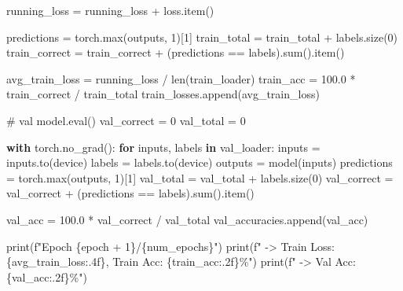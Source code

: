 \documentclass[
  letterpaper,
  DIV=11,
  numbers=noendperiod]{scrartcl}
\newenvironment{Shaded}{\begin{snugshade}}{\end{snugshade}}
\newcommand{\BuiltInTok}[1]{\textcolor[rgb]{0.00,0.23,0.31}{#1}}
\newcommand{\CommentTok}[1]{\textcolor[rgb]{0.37,0.37,0.37}{#1}}
\newcommand{\ControlFlowTok}[1]{\textcolor[rgb]{0.00,0.23,0.31}{\textbf{#1}}}
\newcommand{\DecValTok}[1]{\textcolor[rgb]{0.68,0.00,0.00}{#1}}
\newcommand{\FloatTok}[1]{\textcolor[rgb]{0.68,0.00,0.00}{#1}}
\newcommand{\KeywordTok}[1]{\textcolor[rgb]{0.00,0.23,0.31}{\textbf{#1}}}
\newcommand{\NormalTok}[1]{\textcolor[rgb]{0.00,0.23,0.31}{#1}}
\newcommand{\OperatorTok}[1]{\textcolor[rgb]{0.37,0.37,0.37}{#1}}
\newcommand{\SpecialCharTok}[1]{\textcolor[rgb]{0.37,0.37,0.37}{#1}}
\newcommand{\SpecialStringTok}[1]{\textcolor[rgb]{0.13,0.47,0.30}{#1}}
\begin{document}
\begin{Shaded}
\begin{Highlighting}[]
\NormalTok{            running\_loss }\OperatorTok{=}\NormalTok{ running\_loss }\OperatorTok{+}\NormalTok{ loss.item()}

\NormalTok{            predictions }\OperatorTok{=}\NormalTok{ torch.}\BuiltInTok{max}\NormalTok{(outputs, }\DecValTok{1}\NormalTok{)[}\DecValTok{1}\NormalTok{]}
\NormalTok{            train\_total }\OperatorTok{=}\NormalTok{ train\_total }\OperatorTok{+}\NormalTok{ labels.size(}\DecValTok{0}\NormalTok{)}
\NormalTok{            train\_correct }\OperatorTok{=}\NormalTok{ train\_correct }\OperatorTok{+}\NormalTok{ (predictions }\OperatorTok{==}\NormalTok{ labels).}\BuiltInTok{sum}\NormalTok{().item()}

\NormalTok{        avg\_train\_loss }\OperatorTok{=}\NormalTok{ running\_loss }\OperatorTok{/} \BuiltInTok{len}\NormalTok{(train\_loader)}
\NormalTok{        train\_acc }\OperatorTok{=} \FloatTok{100.0} \OperatorTok{*}\NormalTok{ train\_correct }\OperatorTok{/}\NormalTok{ train\_total}
\NormalTok{        train\_losses.append(avg\_train\_loss)}

        \CommentTok{\# val}
\NormalTok{        model.}\BuiltInTok{eval}\NormalTok{()}
\NormalTok{        val\_correct }\OperatorTok{=} \DecValTok{0}
\NormalTok{        val\_total }\OperatorTok{=} \DecValTok{0}

        \ControlFlowTok{with}\NormalTok{ torch.no\_grad():}
            \ControlFlowTok{for}\NormalTok{ inputs, labels }\KeywordTok{in}\NormalTok{ val\_loader:}
\NormalTok{                inputs }\OperatorTok{=}\NormalTok{ inputs.to(device)}
\NormalTok{                labels }\OperatorTok{=}\NormalTok{ labels.to(device)}
\NormalTok{                outputs }\OperatorTok{=}\NormalTok{ model(inputs)}
\NormalTok{                predictions }\OperatorTok{=}\NormalTok{ torch.}\BuiltInTok{max}\NormalTok{(outputs, }\DecValTok{1}\NormalTok{)[}\DecValTok{1}\NormalTok{]}
\NormalTok{                val\_total }\OperatorTok{=}\NormalTok{ val\_total }\OperatorTok{+}\NormalTok{ labels.size(}\DecValTok{0}\NormalTok{)}
\NormalTok{                val\_correct }\OperatorTok{=}\NormalTok{ val\_correct }\OperatorTok{+}\NormalTok{ (predictions }\OperatorTok{==}\NormalTok{ labels).}\BuiltInTok{sum}\NormalTok{().item()}

\NormalTok{        val\_acc }\OperatorTok{=} \FloatTok{100.0} \OperatorTok{*}\NormalTok{ val\_correct }\OperatorTok{/}\NormalTok{ val\_total}
\NormalTok{        val\_accuracies.append(val\_acc)}

        \BuiltInTok{print}\NormalTok{(}\SpecialStringTok{f"Epoch }\SpecialCharTok{\{}\NormalTok{epoch }\OperatorTok{+} \DecValTok{1}\SpecialCharTok{\}}\SpecialStringTok{/}\SpecialCharTok{\{}\NormalTok{num\_epochs}\SpecialCharTok{\}}\SpecialStringTok{"}\NormalTok{)}
        \BuiltInTok{print}\NormalTok{(}\SpecialStringTok{f" {-}\textgreater{} Train Loss: }\SpecialCharTok{\{}\NormalTok{avg\_train\_loss}\SpecialCharTok{:.4f\}}\SpecialStringTok{, Train Acc: }\SpecialCharTok{\{}\NormalTok{train\_acc}\SpecialCharTok{:.2f\}}\SpecialStringTok{\%"}\NormalTok{)}
        \BuiltInTok{print}\NormalTok{(}\SpecialStringTok{f" {-}\textgreater{} Val Acc: }\SpecialCharTok{\{}\NormalTok{val\_acc}\SpecialCharTok{:.2f\}}\SpecialStringTok{\%"}\NormalTok{)}


\end{Highlighting}
\end{Shaded}
\end{document}
